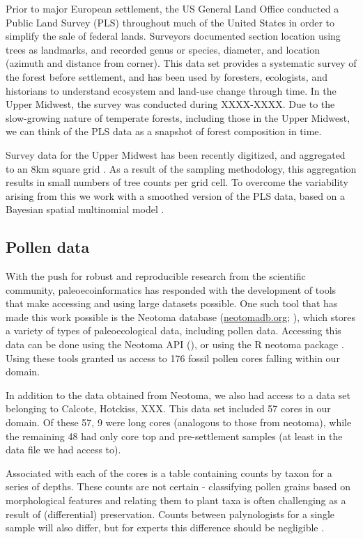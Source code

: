 \documentclass[12pt]{article}
\begin{document}
Prior to major European settlement, the US General Land Office
conducted a Public Land Survey (PLS) throughout much of the United
States in order to simplify the sale of federal lands. Surveyors
documented section location using trees as landmarks, and recorded
genus or species, diameter, and location (azimuth and distance from
corner). This data set provides a systematic survey of the forest
before settlement, and has been used by foresters, ecologists, and
historians to understand ecosystem and land-use change through
time. In the Upper Midwest, the survey was conducted during
XXXX-XXXX. Due to the slow-growing nature of temperate forests,
including those in the Upper Midwest, we can think of the PLS data as
a snapshot of forest composition in time. 

Survey data for the Upper Midwest has been recently digitized, and
aggregated to an 8km square grid \cite{XXX}. As a result of the
sampling methodology, this aggregation results in small numbers of
tree counts per grid cell. To overcome the variability arising from
this we work with a smoothed version of the PLS data, based on a
Bayesian spatial multinomial model \cite{XXX}. 

\subsection{Pollen data}
With the push for robust and reproducible research from the scientific
community, paleoecoinformatics has responded with the development of
tools that make accessing and using large datasets possible. One such
tool that has made this work possible is the Neotoma database
(\url{neotomadb.org}; \cite{XXX}), which stores a variety of types of
paleoecological data, including pollen data. Accessing this data can
be done using the Neotoma API (), or using the R neotoma package
\cite{XXX}. Using these tools granted us access to 176 fossil pollen
cores falling within our domain.

In addition to the data obtained from Neotoma, we also had access to a
data set belonging to Calcote, Hotckiss, XXX. This data set included
57 cores in our domain. Of these 57, 9 were long cores (analogous to
those from neotoma), while the remaining 48 had only core top and
pre-settlement samples (at least in the data file we had access to).

Associated with each of the cores is a table containing counts by
taxon for a series of depths. These counts are not certain -
classifying pollen grains based on morphological features and relating
them to plant taxa is often challenging as a result of (differential)
preservation. Counts between palynologists for a single sample will
also differ, but for experts this difference should be negligible
\cite{XXX}.
\end{document}
